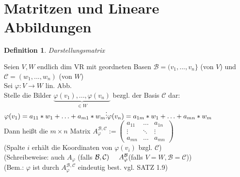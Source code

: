 \documentclass[a4paper,11pt]{article}
\newtheorem{definition}{Definition}[section]
\newcommand{\hsp}{\hspace{5mm}}
\begin{document}
\newpage

\section{Matritzen und Lineare Abbildungen}

\begin{definition}
Darstellungsmatrix
\end{definition}
Seien $V,W$ endlich dim VR mit geordneten Basen $\mathcal{B}=(v_1,...,v_n\}$ (von $V$) und $\mathcal{C}=(w_1,...,w_n)$ (von $W$) \\
Sei $\varphi\colon V\rightarrow W$ lin. Abb. \\
Stelle die Bilder $\underbrace{\varphi(v_1),...,\varphi(v_n)}_{\in W}$ bezgl. der Basis $\mathcal{C}$ dar: \\
$\varphi(v_1)=a_{11}*w_1+\hdots+a_{m1}*w_m \\
\vdots \\
\varphi(v_n)=a_{1m}*w_1+\hdots+a_{mn}*w_m$ \\
Dann heißt die $m\times n$ Matrix $A_\varphi^{\mathcal{B},\mathcal{C}}:=\begin{pmatrix}a_{11}&\hdots&a_{1n}\\\vdots&\ddots&\vdots\\a_{mn}&\hdots&a_{mn}\end{pmatrix}$ \\
(Spalte $i$ erhält die Koordinaten von $\varphi(v_i)$ bzgl. $\mathcal{C}$) \\
(Schreibeweise: auch $A_\varphi$ (falls $\mathcal{B},\mathcal{C})\hsp A_\varphi^{\mathcal{B}}$(falls $V=W,\mathcal{B}=\mathcal{C}$)) \\
(Bem.: $\varphi$ ist durch $A_\varphi^{\mathcal{B},\mathcal{C}}$ eindeutig best. vgl.  SATZ 1.9)
\end{document}
